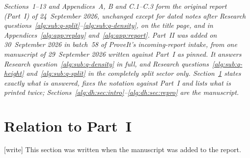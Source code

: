 \documentclass[11pt]{article}
\numberwithin{equation}{section}
\theoremstyle{plain}
\theoremstyle{plain}
\theoremstyle{plain}
\theoremstyle{definition}
\theoremstyle{definition}
\theoremstyle{definition}
\theoremstyle{remark}
\newcommand{\wtag}{\textup{[write]}}%
\begin{document}
\noindent\emph{Sections~1--13 and Appendices~A, B and C.1--C.3 form the
original report (Part~I) of 24~September 2026, unchanged except for dated notes
after Research questions~\ref{alg:sub:q-split}--\ref{alg:sub:q-density},
on the title page, and in Appendices~\ref{alg:app:replay}
and~\ref{alg:app:report}. Part~II was added on 30~September 2026 in
batch~58 of ProveIt's incoming-report intake, from one manuscript of
29~September 2026 written against Part~I as pinned. It answers Research
question~\ref{alg:sub:q-density} in full, and Research
questions~\ref{alg:sub:q-height} and~\ref{alg:sub:q-split} in the
completely split sector only. Section~\ref{alg:dh:sec:relation} states
exactly what is answered, fixes the notation against Part~I and lists
what is printed twice; Sections~\ref{alg:dh:sec:intro}--\ref{alg:dh:sec:repro}
are the manuscript.}


\section{Relation to Part~I}\label{alg:dh:sec:relation}
\wtag{} This section was written when the manuscript was added to the
report.
\end{document}
